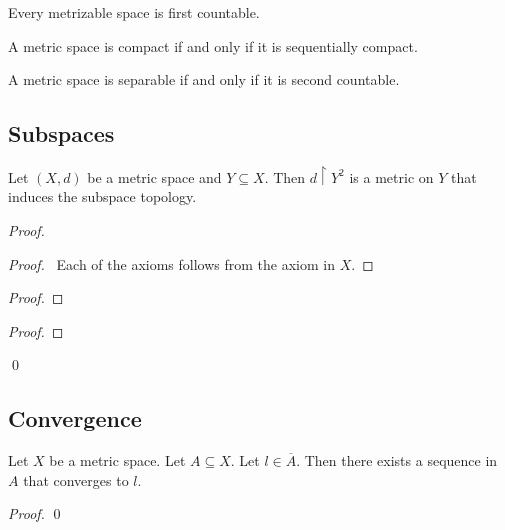 Every metrizable space is first countable.

A metric space is compact if and only if it is sequentially compact.

A metric space is separable if and only if it is second countable.

\subsection{Subspaces}

\begin{prop}
Let $(X,d)$ be a metric space and $Y \subseteq X$. Then $d \restriction Y^2$ is a metric on $Y$ that induces the subspace topology.
\end{prop}

\begin{proof}
\pf
{}
\begin{proof}
	\pf\ Each of the axioms follows from the axiom in $X$.
\end{proof}
\begin{proof}
\end{proof}
\begin{proof}
\end{proof}
\qed
\end{proof}

\subsection{Convergence}

\begin{prop}
Let $X$ be a metric space. Let $A \subseteq X$. Let $l \in \overline{A}$. Then there exists a sequence in $A$ that converges to $l$.
\end{prop}

\begin{proof}
\pf
{}
\qed
\end{proof}

